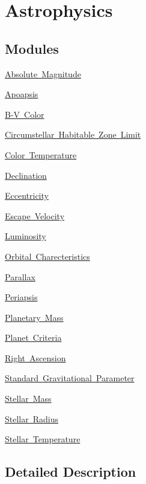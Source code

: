 \hypertarget{group___e_g_x_phys-_astrophysics}{}\section{Astrophysics}
\label{group___e_g_x_phys-_astrophysics}
\subsection*{Modules}
\begin{DoxyCompactItemize}
\item 
\mbox{\hyperlink{group___e_g_x_phys-_astrophysics-_absolute_magnitude}{Absolute Magnitude}}
\item 
\mbox{\hyperlink{group___e_g_x_phys-_apoapsis}{Apoapsis}}
\item 
\mbox{\hyperlink{group___e_g_x_phys-_b-_v_color}{B-\/\+V Color}}
\item 
\mbox{\hyperlink{group___e_g_x_phys-_circumstellar_habitable_zone_limit}{Circumstellar Habitable Zone Limit}}
\item 
\mbox{\hyperlink{group___e_g_x_phys-_astrophysics-_color_temperature}{Color Temperature}}
\item 
\mbox{\hyperlink{group___e_g_x_phys-_astrophysics-_declination}{Declination}}
\item 
\mbox{\hyperlink{group___e_g_x_phys-_eccentricity}{Eccentricity}}
\item 
\mbox{\hyperlink{group___e_g_x_phys-_astrophysics-_escape_velocity}{Escape Velocity}}
\item 
\mbox{\hyperlink{group___e_g_x_phys-_luminosity}{Luminosity}}
\item 
\mbox{\hyperlink{group___e_g_x_phys-_orbital_charecteristics}{Orbital Charecteristics}}
\item 
\mbox{\hyperlink{group___e_g_x_phys-_parallax}{Parallax}}
\item 
\mbox{\hyperlink{group___e_g_x_phys-_periapsis}{Periapsis}}
\item 
\mbox{\hyperlink{group___e_g_x_phys-_planetary_mass}{Planetary Mass}}
\item 
\mbox{\hyperlink{group___e_g_x_phys-_planet_criteria}{Planet Criteria}}
\item 
\mbox{\hyperlink{group___e_g_x_phys-_astrophysics-_right_ascension}{Right Ascension}}
\item 
\mbox{\hyperlink{group___e_g_x_phys-_astrophysics-_standard_gravitational_parameter}{Standard Gravitational Parameter}}
\item 
\mbox{\hyperlink{group___e_g_x_phys-_stellar_mass}{Stellar Mass}}
\item 
\mbox{\hyperlink{group___e_g_x_phys-_stellar_radius}{Stellar Radius}}
\item 
\mbox{\hyperlink{group___e_g_x_phys-_stellar_temperature}{Stellar Temperature}}
\end{DoxyCompactItemize}


\subsection{Detailed Description}
